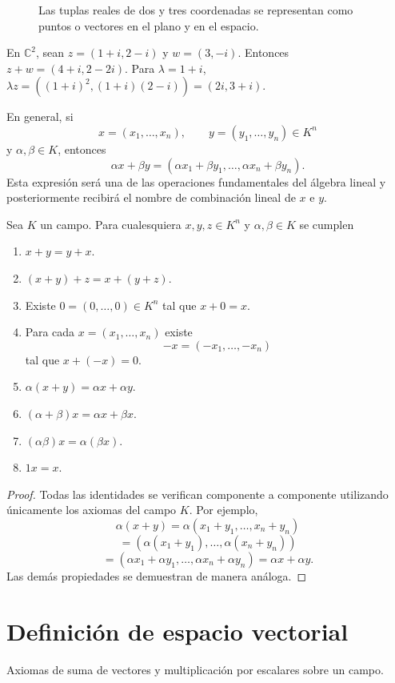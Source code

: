 \begin{figure}[htbp]
  \centering
  
  \caption{Las tuplas reales de dos y tres coordenadas se representan como puntos o vectores en el plano y en el espacio.}
  \label{fig:coordenadas-r2-r3}
\end{figure}
\begin{example}
En $\mathbb{C}^2$, sean $z=(1+i,2-i)$ y $w=(3,-i)$. Entonces
$z+w=(4+i,2-2i)$. Para $\lambda=1+i$,
$\lambda z=((1+i)^2,(1+i)(2-i))=(2i,3+i)$.
\end{example}
\begin{example}
En general, si
\[
x=(x_1,\ldots,x_n),\qquad y=(y_1,\ldots,y_n)\in K^n
\]
y $\alpha,\beta\in K$, entonces
\[
\alpha x+\beta y
=
(\alpha x_1+\beta y_1,\ldots,\alpha x_n+\beta y_n).
\]
Esta expresión será una de las operaciones fundamentales del álgebra lineal y posteriormente recibirá el nombre de combinación lineal de $x$ e $y$.
\end{example}
\begin{proposition}
Sea $K$ un campo. Para cualesquiera $x,y,z\in K^n$ y $\alpha,\beta\in K$ se cumplen
\begin{enumerate}
\item[a)] $x+y=y+x$.
\item[b)] $(x+y)+z=x+(y+z)$.
\item[c)] Existe $0=(0,\ldots,0)\in K^n$ tal que $x+0=x$.
\item[d)] Para cada $x=(x_1,\ldots,x_n)$ existe
\[
-x=(-x_1,\ldots,-x_n)
\]
tal que $x+(-x)=0$.
\item[e)] $\alpha(x+y)=\alpha x+\alpha y$.
\item[f)] $(\alpha+\beta)x=\alpha x+\beta x$.
\item[g)] $(\alpha\beta)x=\alpha(\beta x)$.
\item[h)] $1x=x$.
\end{enumerate}
\end{proposition}
\begin{proof}
Todas las identidades se verifican componente a componente utilizando únicamente los axiomas del campo $K$. Por ejemplo,
\[
\alpha(x+y)
=
\alpha(x_1+y_1,\ldots,x_n+y_n)
\]
\[
=
(\alpha(x_1+y_1),\ldots,\alpha(x_n+y_n))
\]
\[
=
(\alpha x_1+\alpha y_1,\ldots,\alpha x_n+\alpha y_n)
=
\alpha x+\alpha y.
\]
Las demás propiedades se demuestran de manera análoga.
\end{proof}

\section{Definición de espacio vectorial}
Axiomas de suma de vectores y multiplicación por escalares sobre un campo.

